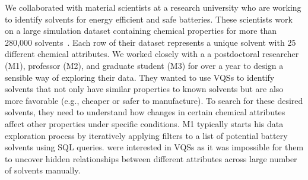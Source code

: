 \par\noindent{} We collaborated with material scientists at a research university who are working to identify solvents for energy efficient and safe batteries. These scientists work on a large simulation dataset containing chemical properties for more than 280,000 solvents~\cite{Khetan2018}. Each row of their dataset represents a unique solvent with 25 different chemical attributes. We worked closely with a a postdoctoral researcher (M1), professor (M2), and graduate student (M3) for over a year to design a sensible way of exploring their data. They wanted to use VQSs to identify solvents that not only have similar properties to known solvents\change{,} but are also more favorable (e.g., cheaper or safer to manufacture). To search for these desired solvents, they need to understand how changes in certain chemical attributes affect other properties under specific conditions.
\npar M1 typically starts his data exploration process by iteratively applying filters to a list of potential battery solvents using SQL queries.  were interested in VQSs as it was impossible for them to uncover hidden relationships between different attributes across large number of solvents manually.%

